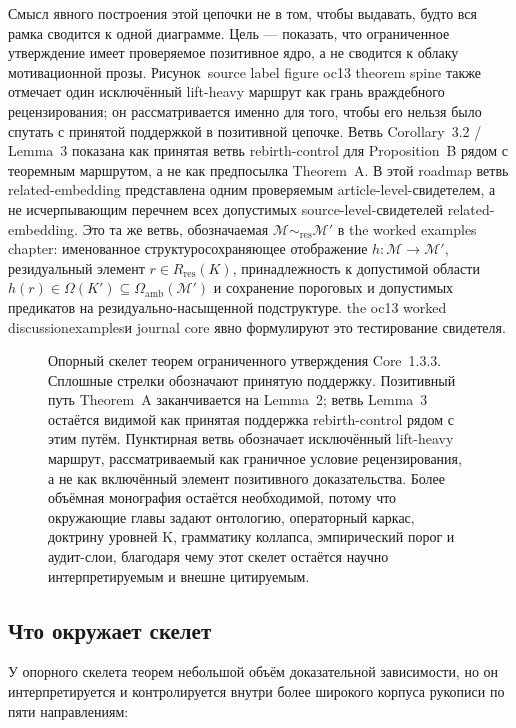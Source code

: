 Смысл явного построения этой цепочки не в том, чтобы выдавать, будто вся рамка сводится к одной диаграмме. Цель — показать, что ограниченное утверждение имеет проверяемое позитивное ядро, а не сводится к облаку мотивационной прозы. Рисунок~source label figure oc13 theorem spine также отмечает один исключённый lift-heavy маршрут как грань враждебного рецензирования; он рассматривается именно для того, чтобы его нельзя было спутать с принятой поддержкой в позитивной цепочке. Ветвь Corollary~3.2 / Lemma~3 показана как принятая ветвь rebirth-control для Proposition~B рядом с теоремным маршрутом, а не как предпосылка Theorem~A. В этой roadmap ветвь related-embedding представлена одним проверяемым article-level-свидетелем, а не исчерпывающим перечнем всех допустимых source-level-свидетелей related-embedding. Это та же ветвь, обозначаемая \(\mathcal{M}\sim_{\mathrm{res}}\mathcal{M}'\) в the worked examples chapter: именованное структуросохраняющее отображение \(h:\mathcal{M}\to\mathcal{M}'\), резидуальный элемент \(r\in R_{\mathrm{res}}(K)\), принадлежность к допустимой области \(h(r)\in\Omega(K')\subseteq\Omega_{\mathrm{amb}}(\mathcal{M}')\) и сохранение пороговых и допустимых предикатов на резидуально-насыщенной подструктуре. the oc13 worked discussionexamplesи journal core явно формулируют это тестирование свидетеля.

\begin{figure}[htbp]
\centering

\caption{Опорный скелет теорем ограниченного утверждения Core~1.3.3. Сплошные стрелки обозначают принятую поддержку. Позитивный путь Theorem~A заканчивается на Lemma~2; ветвь Lemma~3 остаётся видимой как принятая поддержка rebirth-control рядом с этим путём. Пунктирная ветвь обозначает исключённый lift-heavy маршрут, рассматриваемый как граничное условие рецензирования, а не как включённый элемент позитивного доказательства. Более объёмная монография остаётся необходимой, потому что окружающие главы задают онтологию, операторный каркас, доктрину уровней K, грамматику коллапса, эмпирический порог и аудит-слои, благодаря чему этот скелет остаётся научно интерпретируемым и внешне цитируемым.}
\label{fig:oc13-theorem-spine}
\end{figure}

\subsection{Что окружает скелет}

У опорного скелета теорем небольшой объём доказательной зависимости, но он интерпретируется и контролируется внутри более широкого корпуса рукописи по пяти направлениям:

